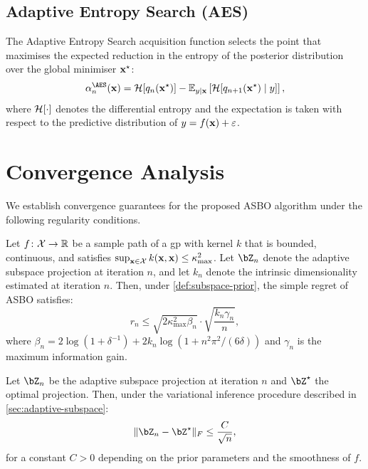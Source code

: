 \subsection{Adaptive Entropy Search (AES)}
\label{subsec:aes}

The Adaptive Entropy Search acquisition function selects the point that
maximises the expected reduction in the entropy of the posterior distribution
over the global minimiser $\mathbf{x}^\star$:
\begin{equation}
    \alpha_n^{\AES}(\bx) = \cH[q_n(\bx^\star)] - \E_{y \mid \bx}\left[\cH[q_{n+1}(\bx^\star) \mid y]\right],
    \label{eq:aes}
\end{equation}
where $\mathcal{H}[\cdot]$ denotes the differential entropy and the expectation is
taken with respect to the predictive distribution of $y = f(\mathbf{x}) + \varepsilon$.

\section{Convergence Analysis}
\label{sec:convergence}

We establish convergence guarantees for the proposed ASBO algorithm under the
following regularity conditions.

\begin{theorembox}[title=Regret Bound for ASBO, label=thm:regret-bound]
\label{thm:regret}
Let $f \colon \mathcal{X} \to \mathbb{R}$ be a sample path of a \gls{gp} with kernel $k$ that
is bounded, continuous, and satisfies $\sup_{\mathbf{x} \in \mathcal{X}} k(\mathbf{x}, \mathbf{x}) \leq \kappa_{\max}^2$.
Let $\bZ_n$ denote the adaptive subspace projection at iteration $n$, and let
$k_n$ denote the intrinsic dimensionality estimated at iteration $n$.  Then,
under \cref{def:subspace-prior}, the simple regret of ASBO satisfies:
\begin{equation}
    r_n \leq \sqrt{2\kappa_{\max}^2 \beta_n} \cdot \sqrt{\frac{k_n \gamma_n}{n}},
    \label{eq:regret-bound}
\end{equation}
where $\beta_n = 2\log(1 + \delta^{-1}) + 2k_n \log(1 + n^2\pi^2/(6\delta))$
and $\gamma_n$ is the maximum information gain.
\end{theorembox}

\begin{lemmabox}[title=Subspace Convergence, label=lem:subspace-convergence]
\label{lem:subspace}
Let $\bZ_n$ be the adaptive subspace projection at iteration $n$ and $\bZ^\star$
the optimal projection.  Then, under the variational inference procedure
described in \cref{sec:adaptive-subspace}:
\begin{equation}
    \| \bZ_n - \bZ^\star \|_F \leq \frac{C}{\sqrt{n}},
    \label{eq:subspace-convergence}
\end{equation}
for a constant $C > 0$ depending on the prior parameters and the smoothness
of $f$.
\end{lemmabox}

